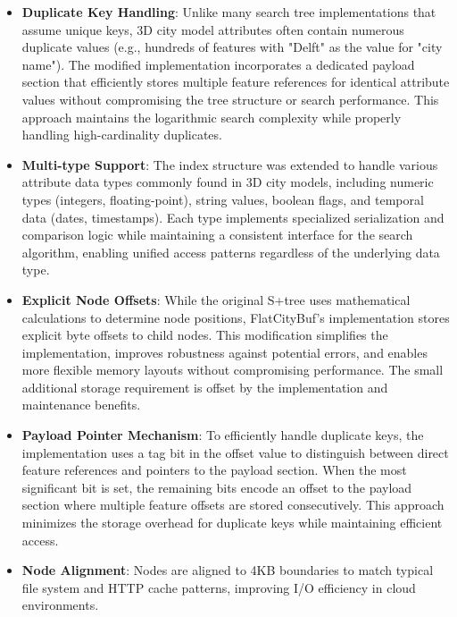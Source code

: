 \begin{itemize}
    \item \textbf{Duplicate Key Handling}: Unlike many search tree implementations that assume unique keys, 3D city model attributes often contain numerous duplicate values (e.g., hundreds of features with "Delft" as the value for "city name"). The modified implementation incorporates a dedicated payload section that efficiently stores multiple feature references for identical attribute values without compromising the tree structure or search performance. This approach maintains the logarithmic search complexity while properly handling high-cardinality duplicates.

    \item \textbf{Multi-type Support}: The index structure was extended to handle various attribute data types commonly found in 3D city models, including numeric types (integers, floating-point), string values, boolean flags, and temporal data (dates, timestamps). Each type implements specialized serialization and comparison logic while maintaining a consistent interface for the search algorithm, enabling unified access patterns regardless of the underlying data type.

    \item \textbf{Explicit Node Offsets}: While the original S+tree uses mathematical calculations to determine node positions, FlatCityBuf's implementation stores explicit byte offsets to child nodes. This modification simplifies the implementation, improves robustness against potential errors, and enables more flexible memory layouts without compromising performance. The small additional storage requirement is offset by the implementation and maintenance benefits.

    \item \textbf{Payload Pointer Mechanism}: To efficiently handle duplicate keys, the implementation uses a tag bit in the offset value to distinguish between direct feature references and pointers to the payload section. When the most significant bit is set, the remaining bits encode an offset to the payload section where multiple feature offsets are stored consecutively. This approach minimizes the storage overhead for duplicate keys while maintaining efficient access.

    \item \textbf{Node Alignment}: Nodes are aligned to 4KB boundaries to match typical file system and HTTP cache patterns, improving I/O efficiency in cloud environments.
\end{itemize}

